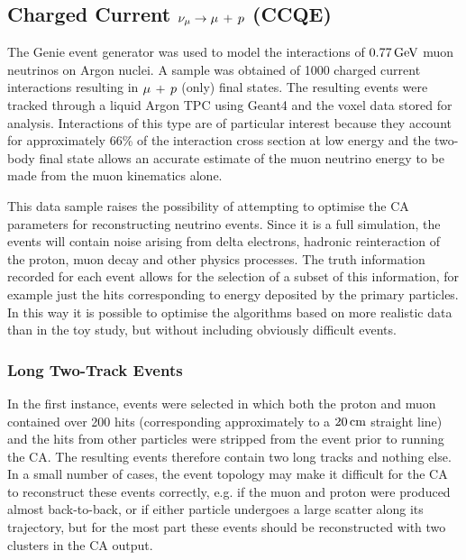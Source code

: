 \subsection{Charged Current $\nu_\mu \rightarrow \mu\,+\,p$ (CCQE)}
The Genie event generator was used to model the interactions of $0.77\,\mathrm{GeV}$ muon neutrinos on Argon nuclei. A sample was obtained of 1000 charged current interactions resulting in $\mu\,+\,p$ (only) final states. The resulting events were tracked through a liquid Argon TPC using Geant4 and the voxel data stored for analysis. Interactions of this type are of particular interest because they account for approximately 66\% of the interaction cross section at low energy and the two-body final state allows an accurate estimate of the muon neutrino energy to be made from the muon kinematics alone.

This data sample raises the possibility of attempting to optimise the \ac{CA} parameters for reconstructing neutrino events. Since it is a full simulation, the events will contain noise arising from delta electrons, hadronic reinteraction of the proton, muon decay and other physics processes. The truth information recorded for each event allows for the selection of a subset of this information, for example just the hits corresponding to energy deposited by the primary particles. In this way it is possible to optimise the algorithms based on more realistic data than in the toy study, but without including obviously difficult events.

\subsubsection{Long Two-Track Events}\label{sec:long_two_track_events}
In the first instance, events were selected in which both the proton and muon contained over 200 hits (corresponding approximately to a $20\,\mathrm{cm}$ straight line) and the hits from other particles were stripped from the event prior to running the \ac{CA}. The resulting events therefore contain two long tracks and nothing else. In a small number of cases, the event topology may make it difficult for the \ac{CA} to reconstruct these events correctly, e.g. if the muon and proton were produced almost back-to-back, or if either particle undergoes a large scatter along its trajectory, but for the most part these events should be reconstructed with two clusters in the \ac{CA} output.

